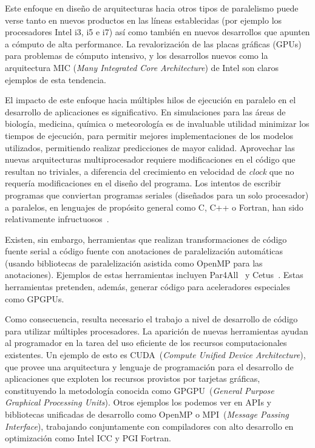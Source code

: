 Este enfoque en dise\~no de arquitecturas hacia otros tipos de paralelismo puede verse tanto en nuevos productos en las l\'ineas establecidas (por ejemplo los procesadores Intel i3, i5 e i7) as\'i como tambi\'en en nuevos desarrollos que apunten a c\'omputo de alta performance.
La revalorizaci\'on de las placas gr\'aficas (GPUs) para problemas de c\'omputo intensivo, y los desarrollos nuevos como la arquitectura MIC (\textit{Many Integrated Core Architecture}) de Intel son claros ejemplos de esta tendencia.

El impacto de este enfoque hacia m\'ultiples hilos de ejecuci\'on en paralelo en el desarrollo de aplicaciones es significativo.
En simulaciones para las \'areas de biolog\'ia, medicina, qu\'imica o meteorolog\'ia es de invaluable utilidad minimizar los tiempos de ejecuci\'on, para permitir mejores implementaciones de los modelos utilizados, permitiendo realizar predicciones de mayor calidad.
Aprovechar las nuevas arquitecturas multiprocesador requiere modificaciones en el c\'odigo que resultan no triviales, a diferencia del crecimiento en velocidad de \textit{clock} que no requer\'ia modificaciones en el dise\~no del programa.
Los intentos de escribir programas que conviertan programas seriales (dise\~nados para un solo procesador) a paralelos, en lenguajes de prop\'osito general como C, C++ o Fortran, han sido relativamente infructuosos~\cite{Pacheco2011}.

Existen, sin embargo, herramientas que realizan transformaciones de c\'odigo fuente serial a c\'odigo fuente con anotaciones de paralelizaci\'on autom\'aticas (usando bibliotecas de paralelizaci\'on asistida como OpenMP para las anotaciones).
Ejemplos de estas herramientas incluyen Par4All~\cite{Par4AllThesis} y Cetus~\cite{CetusPaper}. 
Estas herramientas pretenden, adem\'as, generar c\'odigo para aceleradores especiales como GPGPUs.

Como consecuencia, resulta necesario el trabajo a nivel de desarrollo de c\'odigo para utilizar m\'ultiples procesadores.
La aparici\'on de nuevas herramientas ayudan al programador en la tarea del uso eficiente de los recursos computacionales existentes.
Un ejemplo de esto es \nvidia CUDA~(\textit{Compute Unified Device Architecture}), que provee una arquitectura y lenguaje de programaci\'on para el desarrollo de aplicaciones que exploten los recursos provistos por tarjetas gr\'aficas, constituyendo la metodolog\'ia conocida como GPGPU~(\textit{General Purpose Graphical Processing Units}).
Otros ejemplos los podemos ver en APIs y bibliotecas unificadas de desarrollo como OpenMP o MPI~(\textit{Message Passing Interface}), trabajando conjuntamente con compiladores
con alto desarrollo en optimizaci\'on como Intel ICC y PGI Fortran.

